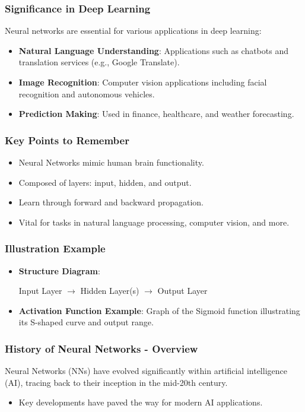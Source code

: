 \documentclass[aspectratio=169]{beamer}
\begin{document}
\begin{frame}[fragile]
    \frametitle{Significance in Deep Learning}
    Neural networks are essential for various applications in deep learning:
    \begin{itemize}
        \item \textbf{Natural Language Understanding}: Applications such as chatbots and translation services (e.g., Google Translate).
        
        \item \textbf{Image Recognition}: Computer vision applications including facial recognition and autonomous vehicles.
        
        \item \textbf{Prediction Making}: Used in finance, healthcare, and weather forecasting.
    \end{itemize}
\end{frame}

\begin{frame}[fragile]
    \frametitle{Key Points to Remember}
    \begin{itemize}
        \item Neural Networks mimic human brain functionality.
        \item Composed of layers: input, hidden, and output.
        \item Learn through forward and backward propagation.
        \item Vital for tasks in natural language processing, computer vision, and more.
    \end{itemize}
\end{frame}

\begin{frame}[fragile]
    \frametitle{Illustration Example}
    \begin{itemize}
        \item \textbf{Structure Diagram}:
        \begin{center}
            Input Layer $\rightarrow$ Hidden Layer(s) $\rightarrow$ Output Layer
        \end{center}
        
        \item \textbf{Activation Function Example}: Graph of the Sigmoid function illustrating its S-shaped curve and output range.
    \end{itemize}
\end{frame}

\begin{frame}[fragile]
    \frametitle{History of Neural Networks - Overview}
    Neural Networks (NNs) have evolved significantly within artificial intelligence (AI), tracing back to their inception in the mid-20th century.
    \begin{itemize}
        \item Key developments have paved the way for modern AI applications.
    \end{itemize}
\end{frame}
\end{document}
